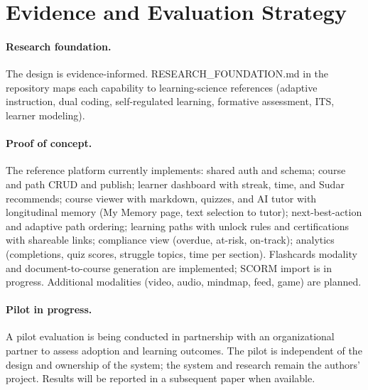 \documentclass[10pt,twocolumn]{article}
\begin{document}
\section{Evidence and Evaluation Strategy}
\label{sec:eval}

\paragraph{Research foundation.}
The design is evidence-informed. RESEARCH\_FOUNDATION.md in the repository maps each capability to learning-science references (adaptive instruction, dual coding, self-regulated learning, formative assessment, ITS, learner modeling).

\paragraph{Proof of concept.}
The reference platform currently implements: shared auth and schema; course and path CRUD and publish; learner dashboard with streak, time, and Sudar recommends; course viewer with markdown, quizzes, and AI tutor with longitudinal memory (My Memory page, text selection to tutor); next-best-action and adaptive path ordering; learning paths with unlock rules and certifications with shareable links; compliance view (overdue, at-risk, on-track); analytics (completions, quiz scores, struggle topics, time per section). Flashcards modality and document-to-course generation are implemented; SCORM import is in progress. Additional modalities (video, audio, mindmap, feed, game) are planned.

\begin{center}
\end{center}

\paragraph{Pilot in progress.}
A pilot evaluation is being conducted in partnership with an organizational partner to assess adoption and learning outcomes. The pilot is independent of the design and ownership of the system; the system and research remain the authors' project. Results will be reported in a subsequent paper when available.
\end{document}
